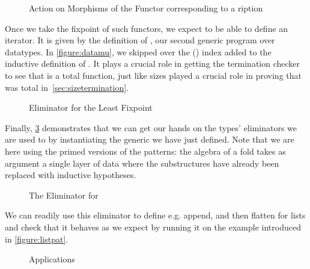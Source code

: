 \begin{figure}[h]
\caption{Action on Morphisms of the Functor corresponding to a ription\label{fig:fmapD}}
\end{figure}

Once we take the fixpoint of such functors, we expect to be able to define
an iterator. It is given by the definition of  , our second
generic program over datatypes. In \cref{figure:datamu}, we skipped over
the  (\cite{DBLP:journals/corr/abs-1012-4896}) index added to the
inductive definition of . It plays a crucial role in getting the
termination checker to see that  is a total function, just like
sizes played a crucial role in proving that 
was total in~\cref{sec:sizetermination}.

\begin{figure}[h]
\caption{Eliminator for the Least Fixpoint}\label{figure:datafold}
\end{figure}

Finally, \cref{fig:listfold} demonstrates that we can get our hands
on the types' eliminators we are used to by instantiating the generic
 we have just defined. Note that we are here using the primed
versions of the patterns: the algebra of a fold takes as argument a
single layer of data where the substructures have already been replaced
with inductive hypotheses.

\begin{figure}
  \caption{The Eliminator for \label{fig:listfold}}
\end{figure}

We can readily use this eliminator to define e.g. append, and then
flatten for lists and check that it behaves as we expect by running
it on the example introduced in \cref{figure:listpat}.

\begin{figure}[h]
\begin{minipage}{0.5\textwidth}
  \end{minipage}\begin{minipage}{0.5\textwidth}
  \end{minipage}
\caption{Applications\label{fig:appendflatten}}
\end{figure}

